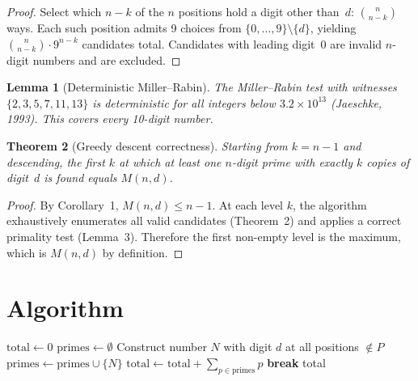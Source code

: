 \documentclass[12pt]{article}
\newtheorem{theorem}{Theorem}
\newtheorem{lemma}[theorem]{Lemma}
\begin{document}
\begin{proof}
Select which $n - k$ of the $n$ positions hold a digit other than~$d$: $\binom{n}{n-k}$ ways. Each such position admits 9 choices from $\{0,\ldots,9\}\setminus\{d\}$, yielding $\binom{n}{n-k}\cdot 9^{n-k}$ candidates total. Candidates with leading digit~0 are invalid $n$-digit numbers and are excluded.
\end{proof}

\begin{lemma}[Deterministic Miller--Rabin]
The Miller--Rabin test with witnesses $\{2,3,5,7,11,13\}$ is deterministic for all integers below $3.2 \times 10^{13}$ (Jaeschke, 1993). This covers every 10-digit number.
\end{lemma}

\begin{theorem}[Greedy descent correctness]
Starting from $k = n-1$ and descending, the first $k$ at which at least one $n$-digit prime with exactly $k$ copies of digit~$d$ is found equals $M(n,d)$.
\end{theorem}

\begin{proof}
By Corollary~1, $M(n,d) \le n-1$. At each level $k$, the algorithm exhaustively enumerates all valid candidates (Theorem~2) and applies a correct primality test (Lemma~3). Therefore the first non-empty level is the maximum, which is $M(n,d)$ by definition.
\end{proof}

\section{Algorithm}

\begin{algorithm}[H]
\caption{Compute $S(10)$}
\begin{algorithmic}[1]
\State $\text{total} \gets 0$
        \State $\text{primes} \gets \emptyset$
                \State Construct number $N$ with digit $d$ at all positions $\notin P$
                    \State $\text{primes} \gets \text{primes} \cup \{N\}$
                \EndIf
            \EndFor
        \EndFor
            \State $\text{total} \gets \text{total} + \sum_{p \in \text{primes}} p$
            \State \textbf{break}
        \EndIf
    \EndFor
\EndFor
\State \Return total
\end{algorithmic}
\end{algorithm}
\end{document}
